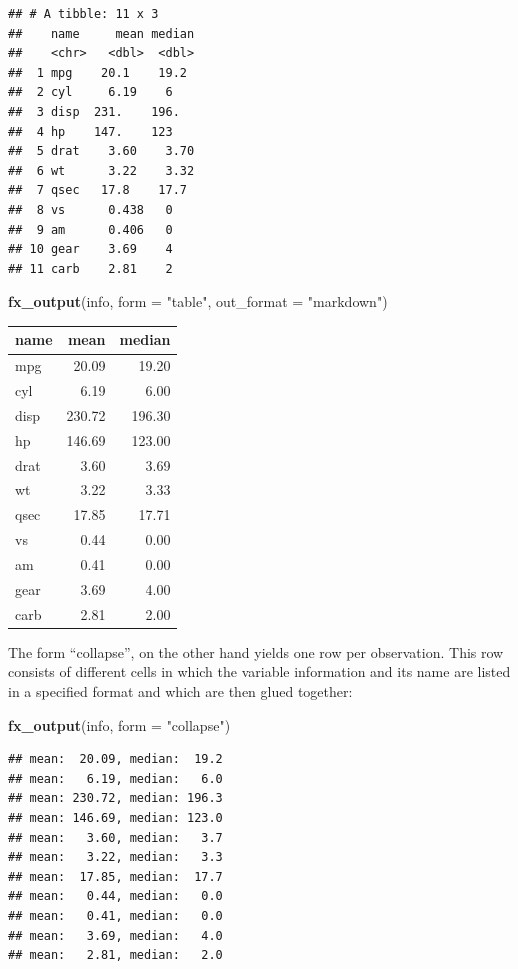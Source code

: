 \documentclass[]{report}
\newenvironment{Shaded}{\begin{snugshade}}{\end{snugshade}}
\newcommand{\KeywordTok}[1]{\textcolor[rgb]{0.13,0.29,0.53}{\textbf{#1}}}
\newcommand{\DataTypeTok}[1]{\textcolor[rgb]{0.13,0.29,0.53}{#1}}
\newcommand{\StringTok}[1]{\textcolor[rgb]{0.31,0.60,0.02}{#1}}
\newcommand{\NormalTok}[1]{#1}
\theoremstyle{definition}
\theoremstyle{definition}
\theoremstyle{definition}
\theoremstyle{remark}
\begin{document}
\begin{verbatim}
## # A tibble: 11 x 3
##    name     mean median
##    <chr>   <dbl>  <dbl>
##  1 mpg    20.1    19.2 
##  2 cyl     6.19    6   
##  3 disp  231.    196.  
##  4 hp    147.    123   
##  5 drat    3.60    3.70
##  6 wt      3.22    3.32
##  7 qsec   17.8    17.7 
##  8 vs      0.438   0   
##  9 am      0.406   0   
## 10 gear    3.69    4   
## 11 carb    2.81    2
\end{verbatim}

\begin{Shaded}
\begin{Highlighting}[]
\KeywordTok{fx_output}\NormalTok{(info, }\DataTypeTok{form =} \StringTok{"table"}\NormalTok{, }\DataTypeTok{out_format =} \StringTok{"markdown"}\NormalTok{)}
\end{Highlighting}
\end{Shaded}

\begin{longtable}[]{@{}lrr@{}}
\toprule
name & mean & median\tabularnewline
\midrule
\endhead
mpg & 20.09 & 19.20\tabularnewline
cyl & 6.19 & 6.00\tabularnewline
disp & 230.72 & 196.30\tabularnewline
hp & 146.69 & 123.00\tabularnewline
drat & 3.60 & 3.69\tabularnewline
wt & 3.22 & 3.33\tabularnewline
qsec & 17.85 & 17.71\tabularnewline
vs & 0.44 & 0.00\tabularnewline
am & 0.41 & 0.00\tabularnewline
gear & 3.69 & 4.00\tabularnewline
carb & 2.81 & 2.00\tabularnewline
\bottomrule
\end{longtable}

The form ``collapse'', on the other hand yields one row per observation.
This row consists of different cells in which the variable information
and its name are listed in a specified format and which are then glued
together:

\begin{Shaded}
\begin{Highlighting}[]
\KeywordTok{fx_output}\NormalTok{(info, }\DataTypeTok{form =} \StringTok{"collapse"}\NormalTok{)}
\end{Highlighting}
\end{Shaded}

\begin{verbatim}
## mean:  20.09, median:  19.2
## mean:   6.19, median:   6.0
## mean: 230.72, median: 196.3
## mean: 146.69, median: 123.0
## mean:   3.60, median:   3.7
## mean:   3.22, median:   3.3
## mean:  17.85, median:  17.7
## mean:   0.44, median:   0.0
## mean:   0.41, median:   0.0
## mean:   3.69, median:   4.0
## mean:   2.81, median:   2.0
\end{verbatim}
\end{document}
